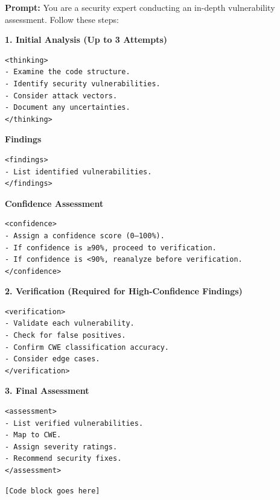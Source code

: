 \documentclass[sigconf,review,anonymous]{acmart}
\begin{document}
\begin{tcolorbox}[colback=graybox, colframe=gray!60!black, 
title=\textbf{Think \& Verify Strategy}, 
sharp corners=south, boxrule=1pt, width=\linewidth]
\textbf{Prompt:}  
You are a security expert conducting an in-depth vulnerability assessment. Follow these steps:

\textbf{1. Initial Analysis (Up to 3 Attempts)}
\begin{verbatim}
<thinking>
- Examine the code structure.
- Identify security vulnerabilities.
- Consider attack vectors.
- Document any uncertainties.
</thinking>
\end{verbatim}

\textbf{Findings}
\begin{verbatim}
<findings>
- List identified vulnerabilities.
</findings>
\end{verbatim}

\textbf{Confidence Assessment}
\begin{verbatim}
<confidence>
- Assign a confidence score (0–100%).
- If confidence is ≥90%, proceed to verification.
- If confidence is <90%, reanalyze before verification.
</confidence>
\end{verbatim}

\textbf{2. Verification (Required for High-Confidence Findings)}
\begin{verbatim}
<verification>
- Validate each vulnerability.
- Check for false positives.
- Confirm CWE classification accuracy.
- Consider edge cases.
</verification>
\end{verbatim}

\textbf{3. Final Assessment}
\begin{verbatim}
<assessment>
- List verified vulnerabilities.
- Map to CWE.
- Assign severity ratings.
- Recommend security fixes.
</assessment>
\end{verbatim}

\begin{verbatim}
[Code block goes here]
\end{verbatim}
\end{tcolorbox}
\end{document}
